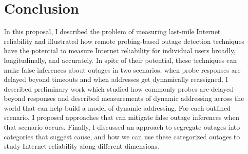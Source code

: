 
\section{Conclusion}

In this proposal, I described the problem of measuring last-mile Internet
reliability and illustrated how remote probing-based outage
detection techniques have the potential to measure Internet
reliability for individual users broadly, longitudinally, and
accurately. In spite of their potential, these techniques can make
false inferences about outages in two scenarios: when probe
responses are delayed beyond timeouts and when addresses get dynamically
reassigned. I described preliminary work which studied how commonly
probes are delayed beyond responses and described measurements of
dynamic addressing across the world that can help build a model of
dynamic addressing. For each outlined scenario, I proposed approaches
that can mitigate false outage inferences when that scenario
occurs. Finally, I discussed an approach to segregate outages into
categories that suggest cause, and how we can use these categorized
outages to study Internet reliability along different dimensions.
